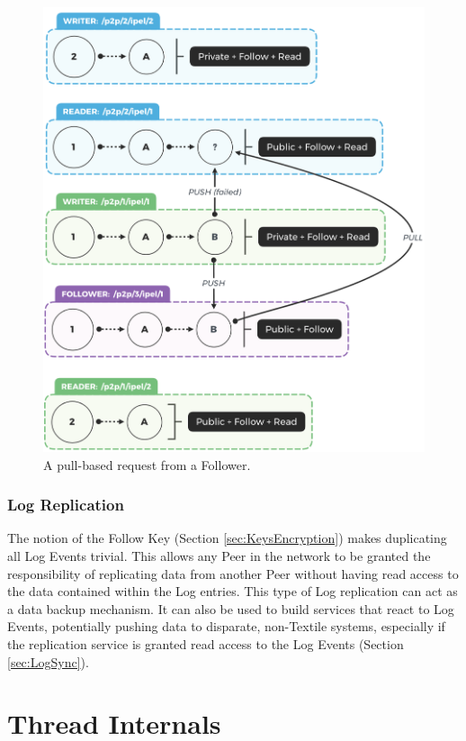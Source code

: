 \documentclass{textile}
\begin{document}
\begin{figure}
  \includegraphics[width=\linewidth]{figures/Pulling.png}
  \caption{A pull-based request from a Follower.}
  \label{fig:Pulling}
\end{figure}

\subsubsection{Log Replication}

The notion of the Follow Key (Section  \ref{sec:KeysEncryption}) makes duplicating all Log Events trivial. This allows any Peer in the network to be granted the responsibility of replicating data from another Peer without having read access to the data contained within the Log entries. This type of Log replication can act as a data backup mechanism. It can also be used to build services that react to Log Events, potentially pushing data to disparate, non-Textile systems, especially if the replication service is granted read access to the Log Events (Section  \ref{sec:LogSync}).

\section{Thread Internals}
\end{document}
